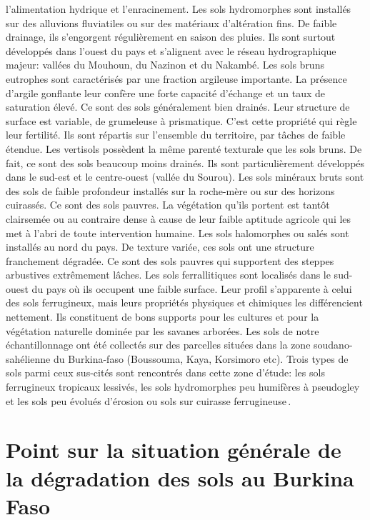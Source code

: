 \documentclass[a4paper,11pt]{article}
\begin{document}
l’alimentation hydrique et l’enracinement. Les sols hydromorphes sont
installés sur des alluvions fluviatiles ou sur des matériaux
d’altération fins. De faible drainage, ils s’engorgent régulièrement
en saison des pluies. Ils sont surtout développés dans l’ouest du pays
et s’alignent avec le réseau hydrographique majeur: vallées du
Mouhoun, du Nazinon et du Nakambé. Les sols bruns eutrophes sont
caractérisés par une fraction argileuse importante. La présence
d’argile gonflante leur confère une forte capacité d’échange et un
taux de saturation élevé. Ce sont des sols généralement bien
drainés. Leur structure de surface est variable, de grumeleuse à
prismatique. C’est cette propriété qui règle leur fertilité. Ils sont
répartis sur l’ensemble du territoire, par tâches de faible
étendue. Les vertisols possèdent la même parenté texturale que les
sols bruns. De fait, ce sont des sols beaucoup moins drainés. Ils sont
particulièrement développés dans le sud-est et le centre-ouest (vallée
du Sourou). Les sols minéraux bruts sont des sols de faible profondeur
installés sur la roche-mère ou sur des horizons cuirassés. Ce sont des
sols pauvres. La végétation qu’ils portent est tantôt clairsemée ou au
contraire dense à cause de leur faible aptitude agricole qui les met à
l’abri de toute intervention humaine. Les sols halomorphes ou salés
sont installés au nord du pays. De texture variée, ces sols ont une
structure franchement dégradée. Ce sont des sols pauvres qui
supportent des steppes arbustives extrêmement lâches. Les sols
ferrallitiques sont localisés dans le sud-ouest du pays où ils
occupent une faible surface. Leur profil s’apparente à celui des sols
ferrugineux, mais leurs propriétés physiques et chimiques les
différencient nettement. Ils constituent de bons supports pour les
cultures et pour la végétation naturelle dominée par les savanes
arborées. Les sols de notre échantillonnage ont été collectés sur des
parcelles situées dans la zone soudano-sahélienne du Burkina-faso
(Boussouma, Kaya, Korsimoro etc). Trois types de sols parmi ceux
sus-cités sont rencontrés dans cette zone d'étude: les sols
ferrugineux tropicaux lessivés, les sols hydromorphes peu humifères à
pseudogley et les sols peu évolués d'érosion ou sols sur cuirasse
ferrugineuse\,\cite{TIROGO_2017}.

\section{Point sur la situation générale de la dégradation des sols au Burkina Faso}
\end{document}
